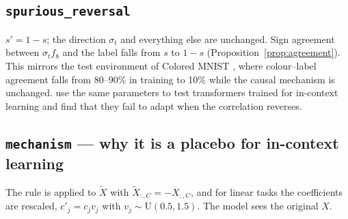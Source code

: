\documentclass[11pt,a4paper]{article}
\newcommand{\1}{\mathbf{1}}
\theoremstyle{plain}
\theoremstyle{definition}
\theoremstyle{remark}
\begin{document}
\subsection{\texorpdfstring{\texttt{spurious\_reversal}}{spurious-reversal}}
\label{sec:spurious-reversal}
$s' = 1 - s$; the direction $\sigma_t$ and everything else are unchanged.
Sign agreement between $\sigma_t f_8$ and the label falls from $s$ to $1-s$
(Proposition~\ref{prop:agreement}). This
mirrors the test environment of Colored MNIST \citep{arjovsky2019invariant},
where colour--label agreement falls from 80--90\% in training to 10\% while
the causal mechanism is unchanged. \citet{chen2026incontext} use the same
parameters to test transformers trained for in-context learning and find
that they fail to adapt when the correlation reverses.

\subsection{\texorpdfstring{\texttt{mechanism}}{mechanism} --- why it is a placebo for in-context learning}
\label{sec:mechanism}

The rule is applied to $\tilde X$ with $\tilde X_{:,C} = -X_{:,C}$, and for
linear tasks the coefficients are rescaled, $c'_j = c_j v_j$ with
$v_j \sim \text{U}(0.5, 1.5)$. The model sees the original $X$.
\end{document}
